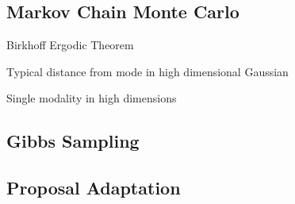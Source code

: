 \subsection{Markov Chain Monte Carlo}
\label{sec:inf:foundation:mcmc}

Birkhoff Ergodic Theorem

Typical distance from mode in high dimensional Gaussian

Single modality in high dimensions

\subsection{Gibbs Sampling}
\label{sec:inf:foundation:gibbs}

\subsection{Proposal Adaptation}
\label{sec:inf:proposal-adapt}